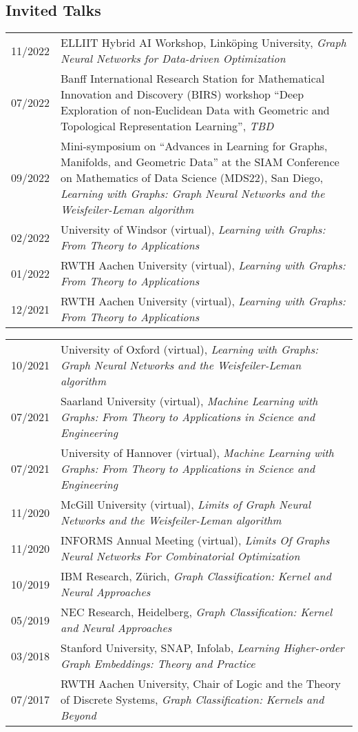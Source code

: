 \documentclass[11pt, a4paper, DIV=12]{scrartcl}
\begin{document}
\subsection*{Invited Talks}
\begin{tabular}{p{2.1cm}p{12.0cm}}

11/2022& ELLIIT Hybrid AI Workshop, Linköping University, \emph{Graph Neural Networks for Data-driven Optimization}\\
07/2022& Banff International Research Station for Mathematical Innovation and Discovery (BIRS) workshop ``Deep Exploration of non-Euclidean Data with Geometric and Topological Representation Learning'',  \emph{TBD}\\	
09/2022& Mini-symposium on ``Advances in Learning for Graphs, Manifolds, and Geometric Data'' at the SIAM Conference on Mathematics of Data Science (MDS22), San Diego, \emph{Learning with Graphs: Graph Neural Networks and the Weisfeiler-Leman algorithm}\\	
02/2022& University of Windsor (virtual), \emph{Learning with Graphs: From Theory to Applications}\\
01/2022&RWTH Aachen University (virtual), \emph{Learning with Graphs: From Theory to Applications}\\
12/2021&RWTH Aachen University (virtual), \emph{Learning with Graphs: From Theory to Applications}\\
\end{tabular}

\begin{tabular}{p{2.1cm}p{12.0cm}}
10/2021&University of Oxford (virtual), \emph{Learning with Graphs: Graph Neural Networks and the Weisfeiler-Leman algorithm}\\
07/2021&Saarland University (virtual), \emph{Machine Learning with Graphs:
	From Theory to Applications in Science and Engineering}\\
07/2021&University of Hannover (virtual), \emph{Machine Learning with Graphs:
	From Theory to Applications in Science and Engineering}\\
11/2020&McGill University (virtual), \emph{Limits of Graph Neural Networks and the Weisfeiler-Leman algorithm}\\
11/2020&INFORMS Annual Meeting (virtual), \emph{Limits Of Graphs Neural Networks For Combinatorial Optimization} \\
10/2019&IBM Research, Zürich, \emph{Graph Classification: Kernel and Neural Approaches}\\
05/2019&NEC Research, Heidelberg, \emph{Graph Classification: Kernel and Neural Approaches}\\ 
03/2018&Stanford University, SNAP, Infolab, \emph{Learning Higher-order Graph Embeddings: Theory and Practice}\\
07/2017&RWTH Aachen University, Chair of Logic and the Theory of Discrete Systems, \emph{Graph Classification: Kernels and Beyond}\\
\end{tabular}
\end{document}
